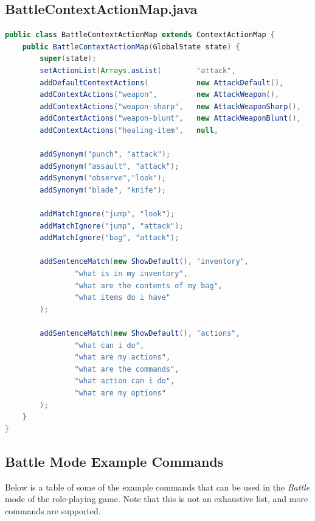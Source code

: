 \documentclass[11pt]{article}
\begin{document}
\subsection{BattleContextActionMap.java}
\label{appendix:battle-context-action-map}
\begin{lstlisting}[language=Java, caption=BattleContextActionMap]
public class BattleContextActionMap extends ContextActionMap {
    public BattleContextActionMap(GlobalState state) {
        super(state);
        setActionList(Arrays.asList(        "attack",                   "heal",             "show",             "look"));
        addDefaultContextActions(           new AttackDefault(),        new HealDefault(),  new ShowDefault(),  new LookDefault());
        addContextActions("weapon",         new AttackWeapon(),         null,               null,               null);
        addContextActions("weapon-sharp",   new AttackWeaponSharp(),    null,               null,               null);
        addContextActions("weapon-blunt",   new AttackWeaponBlunt(),    null,               null,               null);
        addContextActions("healing-item",   null,                       new HealItem(),     null,               null);

        addSynonym("punch", "attack");
        addSynonym("assault", "attack");
        addSynonym("observe","look");
        addSynonym("blade", "knife");

        addMatchIgnore("jump", "look");
        addMatchIgnore("jump", "attack");
        addMatchIgnore("bag", "attack");

        addSentenceMatch(new ShowDefault(), "inventory",
                "what is in my inventory",
                "what are the contents of my bag",
                "what items do i have"
        );

        addSentenceMatch(new ShowDefault(), "actions",
                "what can i do",
                "what are my actions",
                "what are the commands",
                "what action can i do",
                "what are my options"
        );
    }
}
\end{lstlisting}

\newpage
\subsection{Battle Mode Example Commands}
\label{appendix:battle-examples}

Below is a table of some of the example commands that can be used in the \textit{Battle} mode of the role-playing game. Note that this is not an exhaustive list, and more commands are supported.
\end{document}
